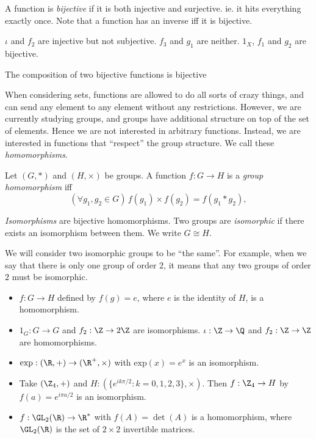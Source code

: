\documentclass[a4paper]{article}
\begin{document}
\begin{defi}
  A function is \emph{bijective} if it is both injective and surjective. ie. it hits everything exactly once. Note that a function has an inverse iff it is bijective.
\end{defi}

\begin{eg}
  $\iota$ and $f_2$ are injective but not subjective. $f_3$ and $g_1$ are neither. $1_X$, $f_1$ and $g_2$ are bijective.
\end{eg}

\begin{lemma}
  The composition of two bijective functions is bijective
\end{lemma}

When considering sets, functions are allowed to do all sorts of crazy things, and can send any element to any element without any restrictions. However, we are currently studying groups, and groups have additional structure on top of the set of elements. Hence we are not interested in arbitrary functions. Instead, we are interested in functions that ``respect'' the group structure. We call these \emph{homomorphisms}.
\begin{defi}
  Let $(G, *)$ and $(H, \times)$ be groups. A function $f:G\rightarrow H$ is a \emph{group homomorphism} iff
  \[
   ( \forall g_1, g_2 \in G)\, f(g_1)\times f(g_2) = f(g_1 * g_2),
  \]
\end{defi}

\begin{defi}
  \emph{Isomorphisms} are bijective homomorphisms. Two groups are \emph{isomorphic} if there exists an isomorphism between them. We write $G\cong H$.
\end{defi}
We will consider two isomorphic groups to be ``the same''. For example, when we say that there is only one group of order $2$, it means that any two groups of order $2$ must be isomorphic.

\begin{eg}\leavevmode
  \begin{itemize}
    \item $f: G \to H$ defined by $f(g) = e$, where $e$ is the identity of $H$, is a homomorphism.
    \item $1_G: G \rightarrow G$ and $f_2: \Z \rightarrow 2\Z$  are isomorphisms. $\iota: \Z\rightarrow\Q$ and $f_2:\Z\rightarrow\Z$ are homomorphisms.
    \item $\mathrm{exp}: (\R, +) \rightarrow (\R^+, \times)$ with $\mathrm{exp}(x) = e^x$ is an isomorphism.
    \item Take $(\Z_4, +)$ and $H: (\{e^{ik\pi/2}:k=0, 1 ,2, 3\}, \times)$. Then $f: \Z_4 \rightarrow H$  by $f(a) = e^{i\pi a/2}$ is an isomorphism.
    \item $f: \GL_2(\R) \rightarrow \R^*$ with $f(A) = \det(A)$ is a homomorphism, where $\GL_2(\R)$ is the set of $2\times 2$ invertible matrices.
  \end{itemize}
\end{eg}
\end{document}
